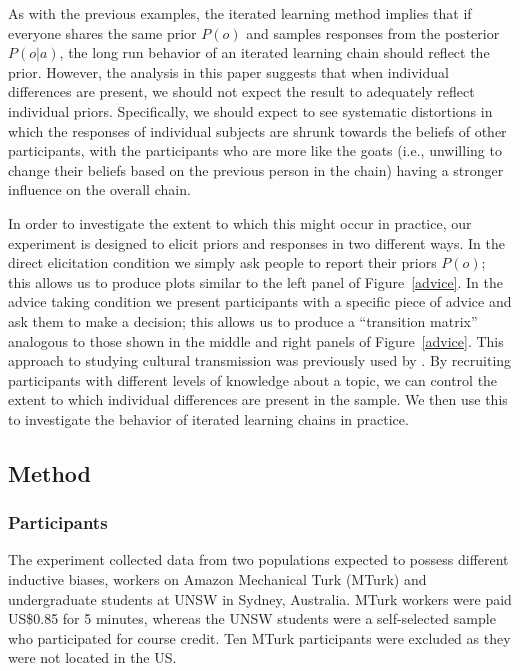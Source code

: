 \documentclass[doc]{apa6}
\begin{document}
As with the previous examples, the iterated learning method implies that if everyone shares the same prior $P(o)$ and samples responses from the posterior $P(o|a)$, the long run behavior of an iterated learning chain should reflect the prior. %
However, the analysis in this paper suggests that when individual differences are present, we should not expect the result to adequately reflect individual priors. Specifically, we should expect to see systematic distortions in which the responses of individual subjects are shrunk towards the beliefs of other participants, with the participants who are more like the {\sc goats} (i.e., unwilling to change their beliefs based on the previous person in the chain) having a stronger influence on the overall chain.

In order to investigate the extent to which this might occur in practice, our experiment is designed to elicit priors and responses in two different ways. In the {\sc direct elicitation} condition we simply ask people to report their priors $P(o)$; this allows us to produce plots similar to the left panel of Figure~\ref{advice}. In the {\sc advice taking} condition we present participants with a specific piece of advice and ask them to make a decision; this allows us to produce a ``transition matrix'' analogous to those shown in the middle and right panels of Figure~\ref{advice}. This approach to studying cultural transmission was previously used by \textcite{ferdinandetal13}. By recruiting participants with different levels of knowledge about a topic, we can control the extent to which individual differences are present in the sample. We then use this to investigate the behavior of iterated learning chains in practice.

\subsection{Method}

\subsubsection{Participants}

The experiment collected data from two populations expected to possess different inductive biases, workers on Amazon Mechanical Turk (MTurk) and undergraduate students at UNSW in Sydney, Australia. MTurk workers were paid US\$0.85 for 5 minutes, whereas the UNSW students were a self-selected sample who participated for course credit. Ten MTurk participants were excluded as they were not located in the US.
\end{document}
